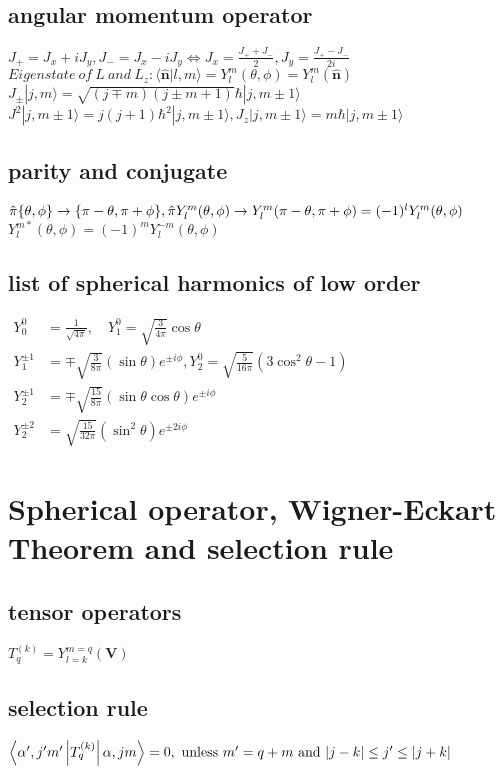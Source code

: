 \documentclass[10pt, oneside]{article}   	%
\begin{document}
\begin{multicols}{2}
\subsection{angular momentum operator}
$J_{+}=J_{x}+i J_{y}, J_{-}=J_{x}-i J_{y}\iff J_x=\frac{J_+ +J_-}{2}, J_y=\frac{J_+-J_-}{2 i}$\\
$Eigenstate\:of\:L\:and\:L_z:\langle\hat{\mathbf{n}} | l, m\rangle= Y_{l}^{m}(\theta, \phi)=Y_{l}^{m}(\hat{\mathbf{n}})$\\
$J_{\pm}|j, m\rangle=\sqrt{(j\mp m)(j\pm m+1)} \hbar|j, m\pm1\rangle$\\
$J^2|j, m\pm1\rangle=j(j+1)\hbar^2|j, m\pm1\rangle, J_z|j, m\pm1\rangle=m\hbar|j, m\pm1\rangle$
\subsection{parity and conjugate}
$\hat{\pi}\{\theta,\phi\}\to\{\pi-\theta,\pi+\phi\}, \\
\hat{\pi}Y_{l}^{m}(\theta,\phi)\to Y_{l}^{m}(\pi-\theta,\pi+\phi)=(-1)^l Y_{l}^{m}(\theta,\phi)$\\
$Y_l^{m*}(\theta,\phi)=(-1)^m Y_l^{-m}(\theta,\phi)$
\subsection{list of spherical harmonics of low order}
$\begin{aligned} Y_{0}^{0} &=\frac{1}{\sqrt{4 \pi}}, \quad Y_{1}^{0}=\sqrt{\frac{3}{4 \pi}} \cos \theta \\ Y_{1}^{\pm 1} &=\mp \sqrt{\frac{3}{8 \pi}}(\sin \theta) e^{\pm i \phi}, Y_{2}^{0} =\sqrt{\frac{5}{16 \pi}}\left(3 \cos ^{2} \theta-1\right) \\ Y_{2}^{\pm 1} &=\mp \sqrt{\frac{15}{8 \pi}}(\sin \theta \cos \theta) e^{\pm i \phi} \\ Y_{2}^{\pm 2} &=\sqrt{\frac{15}{32 \pi}}\left(\sin ^{2} \theta\right) e^{\pm 2 i \phi} \end{aligned}$
\section{Spherical operator, Wigner-Eckart Theorem and selection rule}
\subsection{tensor operators}
$T_q^{(k)}=Y_{l=k}^{m=q}(\mathbf{V})$
\subsection{selection rule}
$\left\langle\alpha^{\prime}, j^{\prime} m^{\prime}\left|T_{q}^{(k)}\right| \alpha, j m\right\rangle= 0, \\
\text { unless } m^{\prime}=q+m \text{ and } |j-k|\le j'\le |j+k|$





\end{multicols}
\end{document}
